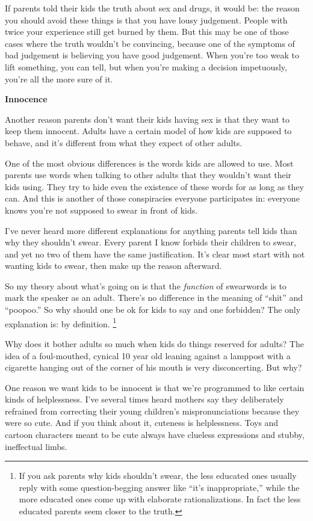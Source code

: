 If parents told their kids the truth about sex and drugs, it would be:
the reason you should avoid these things is that you have lousy
judgement. People with twice your experience still get burned by them.
But this may be one of those cases where the truth wouldn't be
convincing, because one of the symptoms of bad judgement is believing
you have good judgement. When you're too weak to lift something, you can
tell, but when you're making a decision impetuously, you're all the more
sure of it.

\textbf{Innocence}

Another reason parents don't want their kids having sex is that they
want to keep them innocent. Adults have a certain model of how kids are
supposed to behave, and it's different from what they expect of other
adults.

One of the most obvious differences is the words kids are allowed to
use. Most parents use words when talking to other adults that they
wouldn't want their kids using. They try to hide even the existence of
these words for as long as they can. And this is another of those
conspiracies everyone participates in: everyone knows you're not
supposed to swear in front of kids.

I've never heard more different explanations for anything parents tell
kids than why they shouldn't swear. Every parent I know forbids their
children to swear, and yet no two of them have the same justification.
It's clear most start with not wanting kids to swear, then make up the
reason afterward.

So my theory about what's going on is that the \emph{function} of
swearwords is to mark the speaker as an adult. There's no difference in
the meaning of ``shit'' and ``poopoo.'' So why should one be ok for kids
to say and one forbidden? The only explanation is: by definition.
\footnote{If you ask parents why kids shouldn't swear, the less educated
ones usually reply with some question-begging answer like ``it's
inappropriate,'' while the more educated ones come up with elaborate
rationalizations. In fact the less educated parents seem closer to the
truth.}

Why does it bother adults so much when kids do things reserved for
adults? The idea of a foul-mouthed, cynical 10 year old leaning against
a lamppost with a cigarette hanging out of the corner of his mouth is
very disconcerting. But why?

One reason we want kids to be innocent is that we're programmed to like
certain kinds of helplessness. I've several times heard mothers say they
deliberately refrained from correcting their young children's
mispronunciations because they were so cute. And if you think about it,
cuteness is helplessness. Toys and cartoon characters meant to be cute
always have clueless expressions and stubby, ineffectual limbs.

